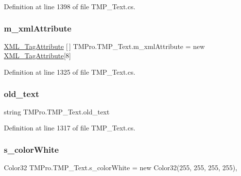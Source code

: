 Definition at line 1398 of file T\+M\+P\+\_\+\+Text.\+cs.

\mbox{\label{class_t_m_pro_1_1_t_m_p___text_a88af71f2ccece16a24c10bb5d1b1da83}} 
\subsubsection{\texorpdfstring{m\_xmlAttribute}{m\_xmlAttribute}}
{\footnotesize\ttfamily \mbox{\hyperlink{struct_t_m_pro_1_1_x_m_l___tag_attribute}{X\+M\+L\+\_\+\+Tag\+Attribute}} \mbox{[}$\,$\mbox{]} T\+M\+Pro.\+T\+M\+P\+\_\+\+Text.\+m\+\_\+xml\+Attribute = new \mbox{\hyperlink{struct_t_m_pro_1_1_x_m_l___tag_attribute}{X\+M\+L\+\_\+\+Tag\+Attribute}}\mbox{[}8\mbox{]}\hspace{0.3cm}{\ttfamily [protected]}}



Definition at line 1325 of file T\+M\+P\+\_\+\+Text.\+cs.

\mbox{\label{class_t_m_pro_1_1_t_m_p___text_aa48e87f2f645db932c63be96aa447fdd}} 
\subsubsection{\texorpdfstring{old\_text}{old\_text}}
{\footnotesize\ttfamily string T\+M\+Pro.\+T\+M\+P\+\_\+\+Text.\+old\+\_\+text\hspace{0.3cm}{\ttfamily [protected]}}



Definition at line 1317 of file T\+M\+P\+\_\+\+Text.\+cs.

\mbox{\label{class_t_m_pro_1_1_t_m_p___text_acb51fd11a369b5109c803b6c57b284d1}} 
\subsubsection{\texorpdfstring{s\_colorWhite}{s\_colorWhite}}
{\footnotesize\ttfamily Color32 T\+M\+Pro.\+T\+M\+P\+\_\+\+Text.\+s\+\_\+color\+White = new Color32(255, 255, 255, 255)\hspace{0.3cm}{\ttfamily [static]}, {\ttfamily [protected]}}



